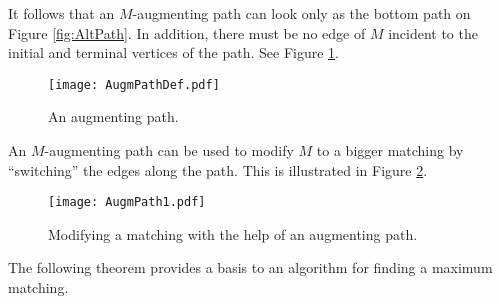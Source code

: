 

\setcounter{section}{4}
\setcounter{subsection}{2}
\setcounter{dfn}{4}


It follows that an $M$-augmenting path can look only as the bottom path on Figure \ref{fig:AltPath}.
In addition, there must be no edge of $M$ incident to the initial and terminal vertices of the path.
See Figure \ref{fig:AugmPathDef}.

\begin{figure}[ht]
\begin{center}
\texttt{[image: AugmPathDef.pdf]}
\end{center}
\caption{An augmenting path.}
\label{fig:AugmPathDef}
\end{figure}

An $M$-augmenting path can be used to modify $M$ to a bigger matching by ``switching'' the edges along the path.
This is illustrated in Figure \ref{fig:AugmPath}.


\begin{figure}[ht]
\begin{center}
\texttt{[image: AugmPath1.pdf]}
\end{center}
\caption{Modifying a matching with the help of an augmenting path.}
\label{fig:AugmPath}
\end{figure}


The following theorem provides a basis to an algorithm for finding a maximum matching.



